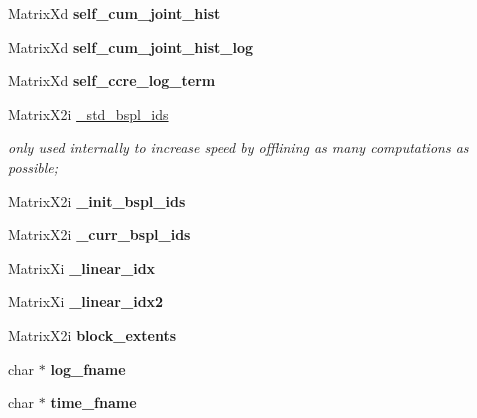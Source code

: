 \begin{DoxyCompactItemize}
\item 
\hypertarget{classCCRE_a7821bb023f4a60221219c8a4c69b7351}{Matrix\-Xd {\bfseries self\-\_\-cum\-\_\-joint\-\_\-hist}}\label{classCCRE_a7821bb023f4a60221219c8a4c69b7351}

\item 
\hypertarget{classCCRE_ac5c4d91774b512e82050e5d95e2fa5c0}{Matrix\-Xd {\bfseries self\-\_\-cum\-\_\-joint\-\_\-hist\-\_\-log}}\label{classCCRE_ac5c4d91774b512e82050e5d95e2fa5c0}

\item 
\hypertarget{classCCRE_a394cc5c5aded9439b9e7c1023f9a4e13}{Matrix\-Xd {\bfseries self\-\_\-ccre\-\_\-log\-\_\-term}}\label{classCCRE_a394cc5c5aded9439b9e7c1023f9a4e13}

\item 
\hypertarget{classCCRE_af7db10318c583dfa60f3d00e65f7a65d}{Matrix\-X2i \hyperlink{classCCRE_af7db10318c583dfa60f3d00e65f7a65d}{\-\_\-std\-\_\-bspl\-\_\-ids}}\label{classCCRE_af7db10318c583dfa60f3d00e65f7a65d}

\begin{DoxyCompactList}\small\item\em only used internally to increase speed by offlining as many computations as possible; \end{DoxyCompactList}\item 
\hypertarget{classCCRE_ae1f206752f925899335da36ab1dbef7b}{Matrix\-X2i {\bfseries \-\_\-init\-\_\-bspl\-\_\-ids}}\label{classCCRE_ae1f206752f925899335da36ab1dbef7b}

\item 
\hypertarget{classCCRE_ae8249f1cf2323c20a61963e812cf4aa9}{Matrix\-X2i {\bfseries \-\_\-curr\-\_\-bspl\-\_\-ids}}\label{classCCRE_ae8249f1cf2323c20a61963e812cf4aa9}

\item 
\hypertarget{classCCRE_a2eb5400ff35dd0c5bea7198ee61c5064}{Matrix\-Xi {\bfseries \-\_\-linear\-\_\-idx}}\label{classCCRE_a2eb5400ff35dd0c5bea7198ee61c5064}

\item 
\hypertarget{classCCRE_a5262075e3786ea02afdb30629e4466ce}{Matrix\-Xi {\bfseries \-\_\-linear\-\_\-idx2}}\label{classCCRE_a5262075e3786ea02afdb30629e4466ce}

\item 
\hypertarget{classCCRE_abde50706b47156bf8869a06c06717978}{Matrix\-X2i {\bfseries block\-\_\-extents}}\label{classCCRE_abde50706b47156bf8869a06c06717978}

\item 
\hypertarget{classCCRE_ae65b69a35d1b40650f5224fa9937bfb7}{char $\ast$ {\bfseries log\-\_\-fname}}\label{classCCRE_ae65b69a35d1b40650f5224fa9937bfb7}

\item 
\hypertarget{classCCRE_aa8e549ac84b7ecb99ac327625d650e2c}{char $\ast$ {\bfseries time\-\_\-fname}}\label{classCCRE_aa8e549ac84b7ecb99ac327625d650e2c}

\end{DoxyCompactItemize}


